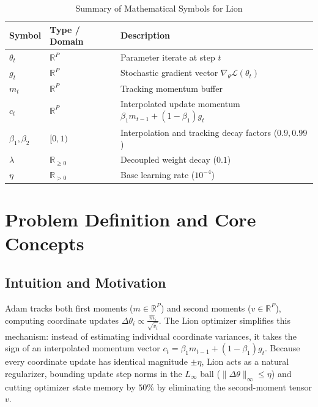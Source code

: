 \documentclass[11pt,a4paper]{article}
\theoremstyle{definition}
\begin{document}
\begin{table}[h]
\centering
\caption{Summary of Mathematical Symbols for Lion}
\begin{tabular}{lll}
\toprule
\textbf{Symbol} & \textbf{Type / Domain} & \textbf{Description} \\
\midrule
$\theta_t$ & $\mathbb{R}^P$ & Parameter iterate at step $t$ \\
$g_t$ & $\mathbb{R}^P$ & Stochastic gradient vector $\nabla_\theta \mathcal{L}(\theta_t)$ \\
$m_t$ & $\mathbb{R}^P$ & Tracking momentum buffer \\
$c_t$ & $\mathbb{R}^P$ & Interpolated update momentum $\beta_1 m_{t-1} + (1 - \beta_1) g_t$ \\
$\beta_1, \beta_2$ & $[0, 1)$ & Interpolation and tracking decay factors ($0.9, 0.99$) \\
$\lambda$ & $\mathbb{R}_{\ge 0}$ & Decoupled weight decay ($0.1$) \\
$\eta$ & $\mathbb{R}_{> 0}$ & Base learning rate ($10^{-4}$) \\
\bottomrule
\end{tabular}
\end{table}

\section{Problem Definition and Core Concepts}

\subsection{Intuition and Motivation}
Adam tracks both first moments ($m \in \mathbb{R}^P$) and second moments ($v \in \mathbb{R}^P$), computing coordinate updates $\Delta \theta_i \propto \frac{\hat{m}_i}{\sqrt{\hat{v}_i}}$. The Lion optimizer simplifies this mechanism: instead of estimating individual coordinate variances, it takes the sign of an interpolated momentum vector $c_t = \beta_1 m_{t-1} + (1 - \beta_1) g_t$. Because every coordinate update has identical magnitude $\pm \eta$, Lion acts as a natural regularizer, bounding update step norms in the $L_\infty$ ball ($\|\Delta \theta\|_\infty \le \eta$) and cutting optimizer state memory by $50\%$ by eliminating the second-moment tensor $v$.
\end{document}
